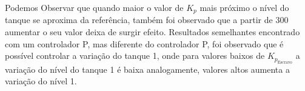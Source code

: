 Podemos Observar que quando maior o valor de $K_p$ mais próximo o nível do tanque se aproxima da referência, também foi observado que a partir de 300
aumentar o seu valor deixa de surgir efeito. Resultados semelhantes encontrado com um controlador P, mas  diferente do controlador P, foi observado que é possível
controlar a variação do tanque 1, onde para valores baixos de  $K_{p_{\textrm{Escravo}}}$ a variação do nível do tanque 1 é baixa analogamente, valores altos aumenta a variação
do nível 1.